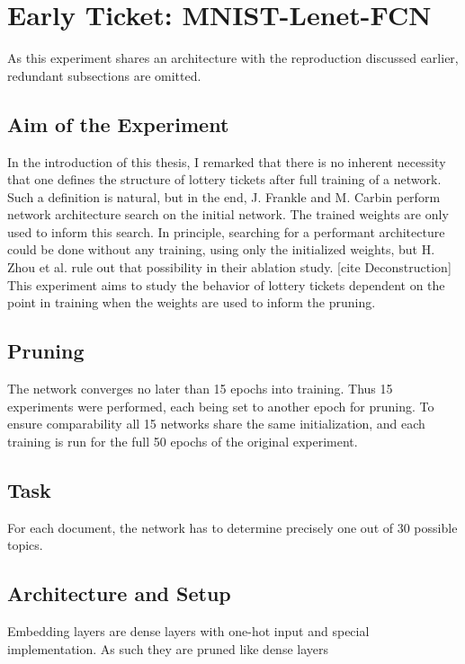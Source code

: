 
\section{Early Ticket: MNIST-Lenet-FCN}
As this experiment shares an architecture with the reproduction discussed earlier, redundant subsections are omitted. 
\subsection*{Aim of the Experiment}
In the introduction of this thesis, I remarked that there is no inherent necessity that one defines the structure of lottery tickets after full training of a network. Such a definition is natural, but in the end, J. Frankle and M. Carbin perform network architecture search on the initial network. The trained weights are only used to inform this search.
In principle, searching for a performant architecture could be done without any training, using only the initialized weights, but H. Zhou et al. rule out that possibility in their ablation study. [cite Deconstruction]
This experiment aims to study the behavior of lottery tickets dependent on the point in training when the weights are used to inform the pruning.
\subsection*{Pruning}
The network converges no later than 15 epochs into training. Thus 15 experiments were performed, each being set to another epoch for pruning. 
To ensure comparability all 15 networks share the same initialization, and each training is run for the full  50 epochs of the original experiment.



\subsection*{Task}
For each document, the network has to determine precisely one out of 30 possible topics.

\subsection*{Architecture and Setup}
Embedding layers are dense layers with one-hot input and special implementation. As such they are pruned like dense layers


